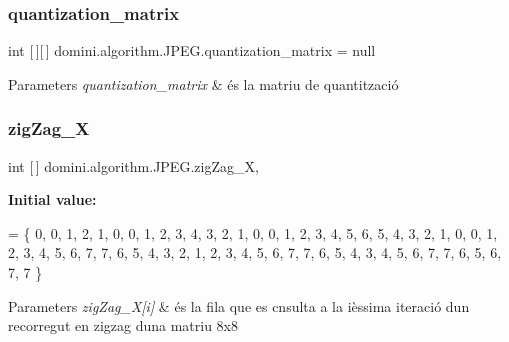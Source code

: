 \subsubsection{\texorpdfstring{quantization\+\_\+matrix}{quantization\_matrix}}
{\footnotesize\ttfamily int \mbox{[}$\,$\mbox{]}\mbox{[}$\,$\mbox{]} domini.\+algorithm.\+J\+P\+E\+G.\+quantization\+\_\+matrix = null\hspace{0.3cm}{\ttfamily [private]}}


\begin{DoxyParams}{Parameters}
{\em quantization\+\_\+matrix} & és la matriu de quantització \\
\hline
\end{DoxyParams}
\mbox{\label{classdomini_1_1algorithm_1_1JPEG_a7d3829cbffd758c087341a8da13dd2ca}} 
\subsubsection{\texorpdfstring{zig\+Zag\+\_\+X}{zigZag\_X}}
{\footnotesize\ttfamily int \mbox{[}$\,$\mbox{]} domini.\+algorithm.\+J\+P\+E\+G.\+zig\+Zag\+\_\+X\hspace{0.3cm}{\ttfamily [static]}, {\ttfamily [private]}}

{\bfseries Initial value\+:}
\begin{DoxyCode}
= \{
        0,
        0, 1,
        2, 1, 0,
        0, 1, 2, 3, 
        4, 3, 2, 1, 0,
        0, 1, 2, 3, 4, 5,
        6, 5, 4, 3, 2, 1, 0,
        0, 1, 2, 3, 4, 5, 6, 7,
        7, 6, 5, 4, 3, 2, 1,
        2, 3, 4, 5, 6, 7,
        7, 6, 5, 4, 3,
        4, 5, 6, 7, 
        7, 6, 5,
        6, 7,
        7
    \}
\end{DoxyCode}

\begin{DoxyParams}{Parameters}
{\em zig\+Zag\+\_\+\+X\mbox{[}i\mbox{]}} & és la fila que es cnsulta a la ièssima iteració d\textquotesingle{}un recorregut en zigzag d\textquotesingle{}una matriu 8x8 \\
\hline
\end{DoxyParams}
\mbox{\label{classdomini_1_1algorithm_1_1JPEG_ad886d8aa00a40cb151b446534f0d1bcc}} 
